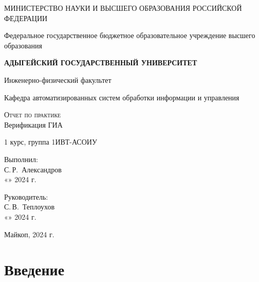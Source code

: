 \documentclass[12pt,a4paper]{scrartcl}
\begin{document}
 \begin{titlepage}
  \begin{center}
   \large
   МИНИСТЕРСТВО НАУКИ И ВЫСШЕГО ОБРАЗОВАНИЯ РОССИЙСКОЙ ФЕДЕРАЦИИ
   
   Федеральное государственное бюджетное образовательное учреждение высшего образования
   
   \textbf{АДЫГЕЙСКИЙ ГОСУДАРСТВЕННЫЙ УНИВЕРСИТЕТ}
   \vspace{0.25cm}
   
   Инженерно-физический факультет
   
   Кафедра автоматизированных систем обработки информации и управления
   \vfill

   \vfill
   
   \textsc{Отчет по практике}\\[5mm]
   
   {\LARGE Верификация ГИА \textit{}}
   \bigskip
   
   1 курс, группа 1ИВТ-АСОИУ
  \end{center}
  \vfill
  
  \newlength{\ML}
  \hfill\begin{minipage}{0.5\textwidth}
   Выполнил:\\
   \underline{\hspace{\ML}} С.\,Р.~Александров\\
   «\underline{\hspace{0.7cm}}» \underline{\hspace{2cm}} 2024 г.
  \end{minipage}%
  \bigskip
  
  \hfill\begin{minipage}{0.5\textwidth}
   Руководитель:\\
   \underline{\hspace{\ML}} С.\,В.~Теплоухов\\
   «\underline{\hspace{0.7cm}}» \underline{\hspace{2cm}} 2024 г.
  \end{minipage}%
  \vfill
  
  \begin{center}
   Майкоп, 2024 г.
  \end{center}
 \end{titlepage}
 
\section{Введение}
\label{sec:intro}
\end{document}
